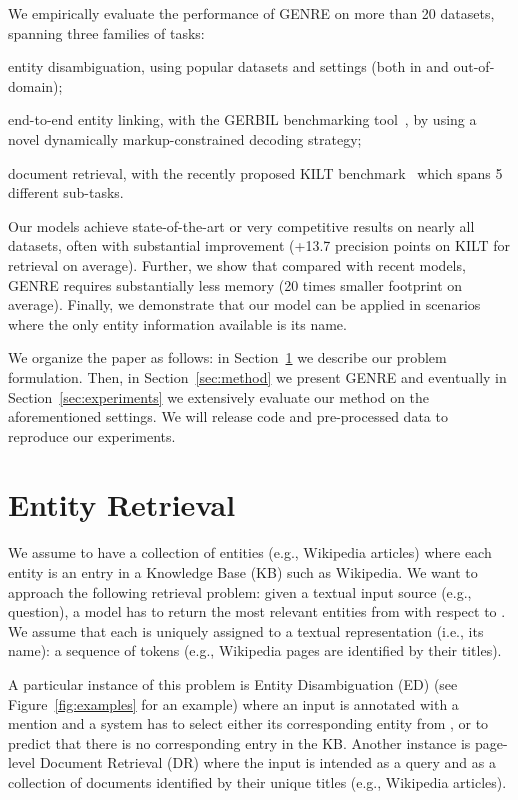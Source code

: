 \documentclass{article} \usepackage{main,times}
\makeatletter
\def\genre{\textsc{GENRE}\@\xspace}
\makeatother
\begin{document}
 

We empirically evaluate the performance of \genre on more than 20 datasets, spanning three families of tasks: 
\begin{enumerate*}[label=(\roman*)] 
\item entity disambiguation, using popular datasets and settings (both in and out-of-domain);
\item end-to-end entity linking, with the GERBIL benchmarking tool~\citep{roder2018gerbil}{}, by using a novel dynamically markup-constrained decoding strategy;
\item document retrieval, with the recently proposed KILT benchmark~\citep{petroni2020kilt} which spans 5 different sub-tasks.
\end{enumerate*}
Our models achieve state-of-the-art or very competitive results on nearly all datasets, often with substantial improvement (+13.7 precision points on KILT for retrieval on average). Further, we show that compared with recent models, \genre requires substantially less memory (20 times smaller footprint on average).
Finally, we demonstrate that our model can be applied in scenarios where the only entity information available is its name.

We organize the paper as follows: in Section~\ref{sec:entity_retrieval} we describe our problem formulation. Then, in Section~\ref{sec:method} we present \genre and eventually in Section~\ref{sec:experiments} we extensively evaluate our method on the aforementioned settings.
We will release code and pre-processed data to reproduce our experiments. \section{Entity Retrieval} \label{sec:entity_retrieval}





We assume to have a collection of entities  (e.g., Wikipedia articles) where each entity is an entry in a Knowledge Base (KB) such as Wikipedia. We want to approach the following retrieval problem: given a textual input source  (e.g., question), a model has to return the most relevant entities from  with respect to . We assume that each  is uniquely assigned to a textual representation (i.e., its name): a sequence of tokens  (e.g., Wikipedia pages are identified by their titles).

A particular instance of this problem is Entity Disambiguation (ED) (see Figure~\ref{fig:examples} for an example) where an input  is annotated with a mention and a system has to select either its corresponding entity from ,
or to predict that there is no corresponding entry in the KB.
Another instance is page-level Document Retrieval (DR) where the input  is intended as a query and  as a collection of documents identified by their unique titles (e.g., Wikipedia articles).
\end{document}
